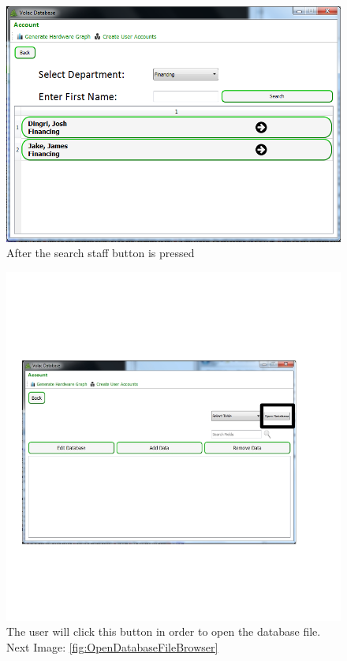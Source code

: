 \begin{figure}[H]
    \includegraphics[width=\textwidth]{./Testing/Images/SearchStaffInterface.png}
    \caption{After the search staff button is pressed} \label{fig:SearchStaffInterface}
\end{figure}

\begin{figure}[H]
    \includegraphics[width=\textwidth]{./Testing/Images/OpenDatabaseFileBefore.png}
    \caption{The user will click this button in order to open the database file. Next Image: \ref{fig:OpenDatabaseFileBrowser} } \label{fig:OpenDatabaseFileBefore}
\end{figure}


